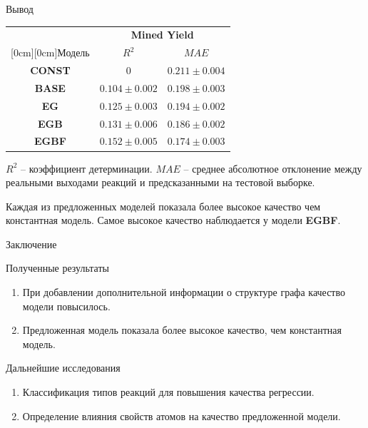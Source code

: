\documentclass[11pt,pdf,hyperref={unicode}]{beamer}
\begin{document}
\begin{frame}{Вывод}
\begin{block}{}

\begin{center}
\begin{tabular}{|c|c|c|}
\hline
& \multicolumn{2}{c|}{\textbf{Mined Yield}} \\
\cline{2-3}
\raisebox{1.5ex}[0cm][0cm]{Модель}
& $R^2$ & $MAE$ \\
\hline
\textbf{CONST} & $0$ & $0.211 \pm 0.004$\\
\hline
\textbf{BASE} & $0.104 \pm 0.002$ & $0.198 \pm 0.003$ \\
\hline
\textbf{EG} & $0.125 \pm 0.003$ & $0.194 \pm 0.002$\\
\hline
\textbf{EGB} & $0.131 \pm 0.006$ & $0.186 \pm 0.002$\\
\hline
\textbf{EGBF} & $0.152 \pm 0.005$ & $0.174 \pm 0.003$\\
\hline
\end{tabular}
\end{center}
\caption{\footnotesize{$R^2$ -- коэффициент детерминации. $MAE$ -- среднее абсолютное отклонение между реальными выходами реакций и предсказанными на тестовой выборке.} }
\end{block}
Каждая из предложенных моделей показала более высокое качество чем константная модель. Самое высокое качество наблюдается у модели \textbf{EGBF}.


\end{frame}


\begin{frame}{Заключение}
    \begin{block}{Полученные результаты}
    \begin{enumerate}
        \item При добавлении дополнительной информации о структуре графа качество модели повысилось.
        \item Предложенная модель показала более высокое качество, чем константная модель.
    \end{enumerate}
    \end{block}
    \begin{block}{Дальнейшие исследования}
    \begin{enumerate}
        \item Классификация типов реакций для повышения качества регрессии.
        \item Определение влияния свойств атомов на качество предложенной модели.
    \end{enumerate}
    \end{block}
\end{frame}
\end{document}
